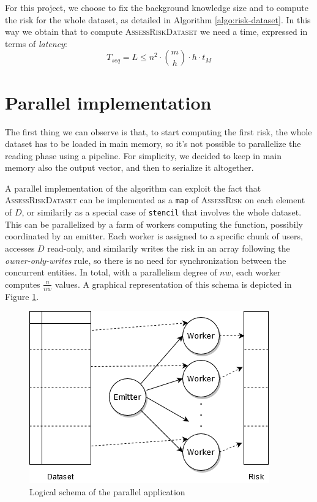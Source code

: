 \documentclass[a4paper]{article}
\begin{document}
For this project, we choose to fix the background knowledge size and to compute the risk for the whole dataset, as detailed in Algorithm \ref{algo:risk-dataset}. In this way we obtain that to compute \textsc{AssessRiskDataset} we need a time, expressed in terms of \textit{latency}:
$$
	T_{seq} = L \le n^2 \cdot \binom{m}{h} \cdot h \cdot t_M
$$

\section{Parallel implementation}

The first thing we can observe is that, to start computing the first risk, the whole dataset has to be loaded in main memory, so it's not possible to parallelize the reading phase using a pipeline. For simplicity, we decided to keep in main memory also the output vector, and then to serialize it altogether.

A parallel implementation of the algorithm can exploit the fact that \textsc{AssessRiskDataset} can be implemented as a \texttt{map} of \textsc{AssessRisk} on each element of $D$, or similarily as a special case of \texttt{stencil} that involves the whole dataset. This can be parallelized by a farm of workers computing the function, possibily coordinated by an emitter. Each worker is assigned to a specific chunk of users, accesses $D$ read-only, and similarily writes the risk in an array following the \textit{owner-only-writes} rule, so there is no need for synchronization between the concurrent entities. In total, with a parallelism degree of $nw$, each worker computes $\frac{n}{nw}$ values. A graphical representation of this schema is depicted in Figure \ref{fig:schema}.

\begin{figure}
    \centering
    \includegraphics[scale=0.7]{img/Schema.png}
    \caption{Logical schema of the parallel application}
    \label{fig:schema}
\end{figure}
\end{document}
